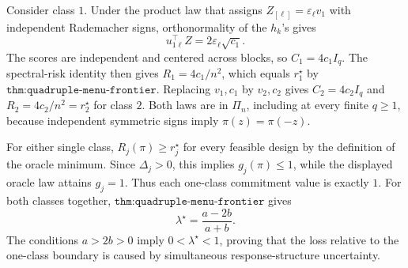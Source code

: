 Consider class \(1\).  Under the product law that assigns \(Z_{[\ell]}=\varepsilon_\ell v_1\) with independent Rademacher signs, orthonormality of the \(h_k\)'s gives
\[
u_{1\ell}^\top Z=2\varepsilon_\ell\sqrt{c_1}.
\]
The scores are independent and centered across blocks, so \(C_1=4c_1I_q\).  The spectral-risk identity then gives \(R_1=4c_1/n^2\), which equals \(r_1^\star\) by \(\texttt{thm:quadruple-menu-frontier}\).  Replacing \(v_1,c_1\) by \(v_2,c_2\) gives \(C_2=4c_2I_q\) and \(R_2=4c_2/n^2=r_2^\star\) for class \(2\).  Both laws are in \(\Pi_n\), including at every finite \(q\ge1\), because independent symmetric signs imply \(\pi(z)=\pi(-z)\).

For either single class, \(R_j(\pi)\ge r_j^\star\) for every feasible design by the definition of the oracle minimum.  Since \(\Delta_j>0\), this implies \(g_j(\pi)\le1\), while the displayed oracle law attains \(g_j=1\).  Thus each one-class commitment value is exactly \(1\).  For both classes together, \(\texttt{thm:quadruple-menu-frontier}\) gives
\[
\lambda^\star=\frac{a-2b}{a+b}.
\]
The conditions \(a>2b>0\) imply \(0<\lambda^\star<1\), proving that the loss relative to the one-class boundary is caused by simultaneous response-structure uncertainty.